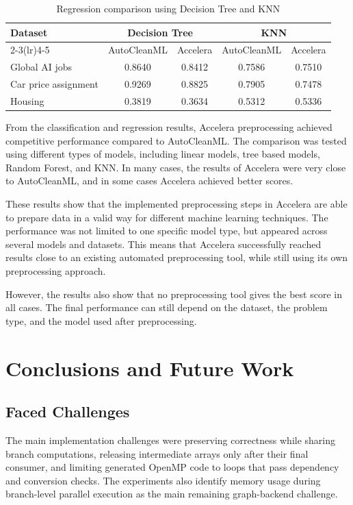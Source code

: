 \documentclass[12pt,a4paper]{report}
\newcommand{\acceleraTableStyle}{%
\small
\renewcommand{\arraystretch}{1.15}
\setlength{\tabcolsep}{4pt}%
}
\begin{document}
\begin{table}[H]
\centering
\acceleraTableStyle
\caption{Regression comparison using Decision Tree and KNN}
\label{tab:regression-dt-knn-autoclean-accelera}
\begin{tabular}{p{}cccc}
\toprule
Dataset & \multicolumn{2}{c}{Decision Tree} & \multicolumn{2}{c}{KNN} \\
\cmidrule(lr){2-3}\cmidrule(lr){4-5}
 & AutoCleanML & Accelera & AutoCleanML & Accelera \\
\midrule
Global AI jobs & 0.8640 & 0.8412 & 0.7586 & 0.7510 \\
Car price assignment & 0.9269 & 0.8825 & 0.7905 & 0.7478 \\
Housing & 0.3819 & 0.3634 & 0.5312 & 0.5336 \\
\bottomrule
\end{tabular}
\end{table}

\noindent From the classification and regression results, Accelera preprocessing achieved
competitive performance compared to AutoCleanML. The comparison was tested using
different types of models, including linear models, tree based models, Random
Forest, and KNN. In many cases, the results of Accelera were very close to
AutoCleanML, and in some cases Accelera achieved better scores.

\noindent These results show that the implemented preprocessing steps in Accelera are able
to prepare data in a valid way for different machine learning techniques. The
performance was not limited to one specific model type, but appeared across
several models and datasets. This means that Accelera successfully reached
results close to an existing automated preprocessing tool, while still using its
own preprocessing approach.

\noindent However, the results also show that no preprocessing tool gives the best score
in all cases. The final performance can still depend on the dataset, the problem
type, and the model used after preprocessing.

\automlcomparativeresults

\chapter{Conclusions and Future Work}
\section{Faced Challenges}
The main implementation challenges were preserving correctness while sharing
branch computations, releasing intermediate arrays only after their final
consumer, and limiting generated OpenMP code to loops that pass dependency and
conversion checks. The experiments also identify memory usage during
branch-level parallel execution as the main remaining graph-backend challenge.
\end{document}
